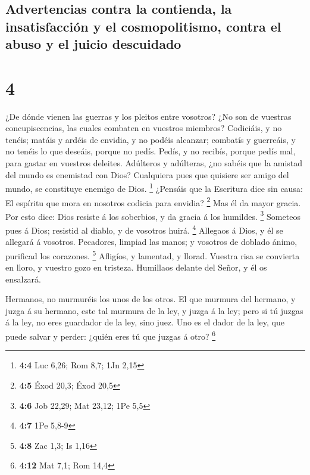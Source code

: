 \hypertarget{advertencias-contra-la-contienda-la-insatisfacciuxf3n-y-el-cosmopolitismo-contra-el-abuso-y-el-juicio-descuidado}{%
\subsection{Advertencias contra la contienda, la insatisfacción y el
cosmopolitismo, contra el abuso y el juicio
descuidado}\label{advertencias-contra-la-contienda-la-insatisfacciuxf3n-y-el-cosmopolitismo-contra-el-abuso-y-el-juicio-descuidado}}

\hypertarget{section-3}{%
\section{4}\label{section-3}}

 ¿De dónde vienen las guerras y los pleitos entre
vosotros? ¿No son de vuestras concupiscencias, las cuales combaten en
vuestros miembros?  Codiciáis, y no tenéis; matáis y
ardéis de envidia, y no podéis alcanzar; combatís y guerreáis, y no
tenéis lo que deseáis, porque no pedís.  Pedís, y no
recibís, porque pedís mal, para gastar en vuestros deleites.
 Adúlteros y adúlteras, ¿no sabéis que la amistad del
mundo es enemistad con Dios? Cualquiera pues que quisiere ser amigo del
mundo, se constituye enemigo de Dios. \footnote{\textbf{4:4} Luc 6,26;
  Rom 8,7; 1Jn 2,15}  ¿Pensáis que la Escritura dice sin
causa: El espíritu que mora en nosotros codicia para envidia?
\footnote{\textbf{4:5} Éxod 20,3; Éxod 20,5}  Mas él da
mayor gracia. Por esto dice: Dios resiste á los soberbios, y da gracia á
los humildes. \footnote{\textbf{4:6} Job 22,29; Mat 23,12; 1Pe 5,5}
 Someteos pues á Dios; resistid al diablo, y de vosotros
huirá. \footnote{\textbf{4:7} 1Pe 5,8-9}  Allegaos á Dios,
y él se allegará á vosotros. Pecadores, limpiad las manos; y vosotros de
doblado ánimo, purificad los corazones. \footnote{\textbf{4:8} Zac 1,3;
  Is 1,16}  Afligíos, y lamentad, y llorad. Vuestra risa
se convierta en lloro, y vuestro gozo en tristeza. 
Humillaos delante del Señor, y él os ensalzará.

 Hermanos, no murmuréis los unos de los otros. El que
murmura del hermano, y juzga á su hermano, este tal murmura de la ley, y
juzga á la ley; pero si tú juzgas á la ley, no eres guardador de la ley,
sino juez.  Uno es el dador de la ley, que puede salvar y
perder: ¿quién eres tú que juzgas á otro? \footnote{\textbf{4:12} Mat
  7,1; Rom 14,4}


